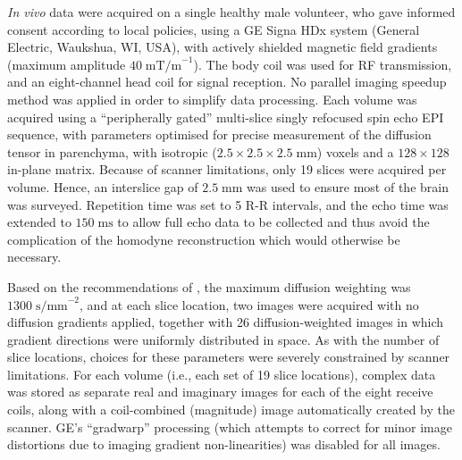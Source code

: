 \documentclass[authoryear,preprint,12pt]{elsarticle}
\begin{document}
\textit{In vivo} data were acquired on a single healthy male
volunteer, who gave informed consent according to local policies,
using a GE Signa HDx system (General Electric, Waukshua, WI, USA),
with actively shielded magnetic field gradients (maximum amplitude
$40\;\text{mT/m}^{-1}$).  The body coil was used for RF transmission,
and an eight-channel head coil for signal reception.  No parallel
imaging speedup method was applied in order to simplify data
processing.  Each volume was acquired using a ``peripherally gated''
multi-slice singly refocused spin echo EPI sequence, with parameters
optimised for precise measurement of the diffusion tensor in
parenchyma, with isotropic ($2.5{\times}2.5{\times}2.5\;\text{mm}$)
voxels and a $128{\times}128$ in-plane matrix.  Because of scanner
limitations, only 19 slices were acquired per volume.  Hence, an
interslice gap of $2.5\;\text{mm}$ was used to ensure most of the
brain was surveyed.  Repetition time was set to 5 R-R intervals, 
and the echo time was extended to $150\;\text{ms}$ to allow full echo
data to be collected and thus avoid the complication of the homodyne
reconstruction which would otherwise be necessary.  

Based on the recommendations of \citet{DKJones99},
the maximum diffusion weighting was $1300\;\text{s/mm}^{-2}$, and at
each slice location, two images were acquired with no diffusion
gradients applied, together with 26 diffusion-weighted images in which
gradient directions were uniformly distributed in space.  As with the
number of slice locations, choices for these parameters were severely
constrained by scanner limitations.  For each volume (i.e., each set
of 19 slice locations), complex data was stored as separate real and
imaginary images for each of the eight receive coils, along with a
coil-combined (magnitude) image automatically created by the scanner.
GE's ``gradwarp'' processing (which attempts to correct for minor
image distortions due to imaging gradient non-linearities) was
disabled for all images.
\end{document}
